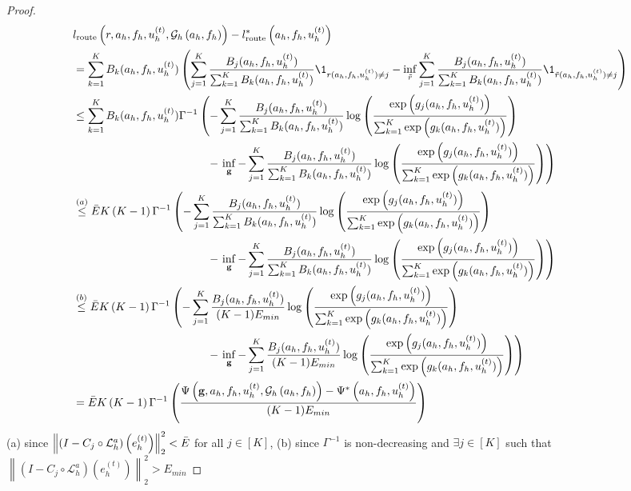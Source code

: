 \documentclass{article} %
\begin{document}
\begin{proof}
\begin{align*}
    &l_{\text{route}}\left(r, a_h, f_h, u^{(t)}_h, \mathcal{G}_h\left(a_h, f_h\right)\right) - l_{\text{route}}^*\left(a_h, f_h, u^{(t)}_h\right) \\
    &= \sum_{k = 1}^K B_k(a_h, f_h, u^{(t)}_h)\left(\sum_{j = 1}^K \frac{B_j(a_h, f_h, u^{(t)}_h)}{\sum_{k = 1}^K B_k(a_h, f_h, u^{(t)}_h)}\1_{r(a_h, f_h, u^{(t)}_h) \neq j} - \inf_{\Tilde{r}} \sum_{j = 1}^K \frac{B_j(a_h, f_h, u^{(t)}_h)}{ \sum_{k = 1}^K B_k(a_h, f_h, u^{(t)}_h)}\1_{\tilde{r}(a_h, f_h, u^{(t)}_h) \neq j}\right) \\
    &\leq \sum_{k = 1}^K B_k(a_h, f_h, u^{(t)}_h)\Gamma^{-1}\left(-\sum_{j = 1}^K \frac{B_j(a_h, f_h, u^{(t)}_h)}{\sum_{k = 1}^K B_k(a_h, f_h, u^{(t)}_h)}\log\left(\frac{\exp\left(g_j(a_h, f_h, u^{(t)}_h)\right)}{\sum_{k = 1}^K\exp\left(g_k(a_h, f_h, u^{(t)}_h)\right)}\right) \right.\\&\quad\quad\quad\quad\quad\quad\quad\quad\quad\quad\quad\quad- \left.\inf_{\mathbf{g}} -\sum_{j = 1}^K \frac{B_j(a_h, f_h, u^{(t)}_h)}{\sum_{k = 1}^K B_k(a_h, f_h, u^{(t)}_h)}\log\left(\frac{\exp\left(g_j(a_h, f_h, u^{(t)}_h)\right)}{\sum_{k = 1}^K\exp\left(g_k(a_h, f_h, u^{(t)}_h)\right)}\right) \right) \\
    &\overset{(a)}{\leq} \Bar{E}K\left(K- 1\right)\Gamma^{-1}\left(-\sum_{j = 1}^K \frac{B_j(a_h, f_h, u^{(t)}_h)}{\sum_{k = 1}^K B_k(a_h, f_h, u^{(t)}_h)}\log\left(\frac{\exp\left(g_j(a_h, f_h, u^{(t)}_h)\right)}{\sum_{k = 1}^K\exp\left(g_k(a_h, f_h, u^{(t)}_h)\right)}\right) \right.\\&\quad\quad\quad\quad\quad\quad\quad\quad\quad\quad\quad\quad- \left.\inf_{\mathbf{g}} -\sum_{j = 1}^K \frac{B_j(a_h, f_h, u^{(t)}_h)}{\sum_{k = 1}^K B_k(a_h, f_h, u^{(t)}_h)}\log\left(\frac{\exp\left(g_j(a_h, f_h, u^{(t)}_h)\right)}{\sum_{k = 1}^K\exp\left(g_k(a_h, f_h, u^{(t)}_h)\right)}\right) \right) \\
    &\overset{(b)}{\leq} \Bar{E}K\left(K- 1\right)\Gamma^{-1}\left(-\sum_{j = 1}^K \frac{B_j(a_h, f_h, u^{(t)}_h)}{(K - 1)E_{min}}\log\left(\frac{\exp\left(g_j(a_h, f_h, u^{(t)}_h)\right)}{\sum_{k = 1}^K\exp\left(g_k(a_h, f_h, u^{(t)}_h)\right)}\right) \right.\\&\quad\quad\quad\quad\quad\quad\quad\quad\quad\quad\quad\quad- \left.\inf_{\mathbf{g}} -\sum_{j = 1}^K \frac{B_j(a_h, f_h, u^{(t)}_h)}{(K - 1)E_{min}}\log\left(\frac{\exp\left(g_j(a_h, f_h, u^{(t)}_h)\right)}{\sum_{k = 1}^K\exp\left(g_k(a_h, f_h, u^{(t)}_h)\right)}\right) \right) \\
    &= \Bar{E}K\left(K- 1\right)\Gamma^{-1}\left(\frac{\Psi\left(\mathbf{g}, a_h, f_h, u^{(t)}_h, \mathcal{G}_h\left(a_h, f_h\right)\right)- \Psi^*\left(a_h, f_h, u^{(t)}_h\right)}{(K - 1)E_{min}} \right)
\end{align*}
(a) since $\left\|\left( I - C_{j} \circ \mathcal{L}_{h}^a\right)\left(e^{(t)}_h\right)\right\|^2_2 < \Bar{E}$ for all $j \in [K]$, (b) since $\Gamma^{-1}$ is non-decreasing and $\exists j \in [K]$ such that $\left\|\left( I - C_{j} \circ \mathcal{L}_{h}^a\right)\left(e^{(t)}_h\right)\right\|^2_2 > E_{min}$


\end{proof}
\end{document}
